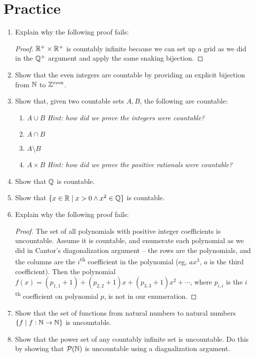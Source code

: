 \documentclass[main.tex]{subfiles}
\begin{document}
\section{Practice}

\begin{enumerate}
	\item Explain why the following proof fails:
	\begin{proof}
		\(\mathbb{R}^{+} \times \mathbb{R}^{+}\) is countably infinite because we can set up a grid as we did in the \(\mathbb{Q}^{+}\) argument and apply the same snaking bijection. \mbox{}
	\end{proof}
	\item Show that the even integers are countable by providing an explicit bijection from \(\mathbb{N}\) to \(\mathbb{Z}^{\text{even}}\).
	\item Show that, given two countable sets \(A,B\), the following are countable:
	\begin{enumerate}
		\item \(A \cup B\) \textit{Hint: how did we prove the integers were countable?}
		\item \(A \cap B\)
		\item \(A \setminus B\)
		\item \(A \times B\) \textit{Hint: how did we prove the positive rationals were countable?}
	\end{enumerate}
	\item Show that \(\mathbb{Q}\) is countable.
	\item Show that \(\{ x \in \mathbb{R} \mid x > 0 \land x^2 \in \mathbb{Q} \}\) is countable.
	\item Explain why the following proof fails:
	\begin{proof}
		The set of all polynomials with positive integer coefficients is uncountable. Assume it is countable, and enumerate each polynomial as we did in Cantor's diagonalization argument -- the rows are the polynomials, and the columns are the \(i\)\textsuperscript{th} coefficient in the polynomial (eg, \(ax^3\), \(a\) is the third coefficient). Then the polynomial \(f(x) = (p_{1,1}+1) + (p_{2,2}+1)x + (p_{3,3}+1)x^2 + \cdots\), where \(p_{i,i}\) is the \(i\)\textsuperscript{th} coefficient on polynomial \(p\), is not in our enumeration.
	\end{proof}
	\item Show that the set of functions from natural numbers to natural numbers \(\{ f \mid f : \mathbb{N} \rightarrow \mathbb{N} \}\) is uncountable.
	\item Show that the power set of any countably infinite set is uncountable. Do this by showing that \(\mathcal{P}(\mathbb{N})\) is uncountable using a diagnalization argument.

\end{enumerate}
\end{document}
